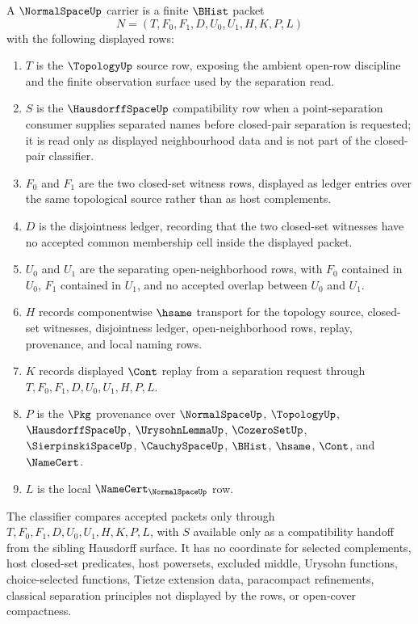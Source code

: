 \begin{definition}
\label{def:normal-space-carrier}
A $\NormalSpaceUp$ carrier is a finite $\BHist$ packet
$$
N=(T,F_0,F_1,D,U_0,U_1,H,K,P,L)
$$
with the following displayed rows:
\begin{enumerate}
\item $T$ is the $\TopologyUp$ source row, exposing the ambient open-row discipline and the finite observation surface used by the separation read.
\item $S$ is the $\HausdorffSpaceUp$ compatibility row when a point-separation consumer supplies separated names before closed-pair separation is requested; it is read only as displayed neighbourhood data and is not part of the closed-pair classifier.
\item $F_0$ and $F_1$ are the two closed-set witness rows, displayed as ledger entries over the same topological source rather than as host complements.
\item $D$ is the disjointness ledger, recording that the two closed-set witnesses have no accepted common membership cell inside the displayed packet.
\item $U_0$ and $U_1$ are the separating open-neighborhood rows, with $F_0$ contained in $U_0$, $F_1$ contained in $U_1$, and no accepted overlap between $U_0$ and $U_1$.
\item $H$ records componentwise $\hsame$ transport for the topology source, closed-set witnesses, disjointness ledger, open-neighborhood rows, replay, provenance, and local naming rows.
\item $K$ records displayed $\Cont$ replay from a separation request through $T,F_0,F_1,D,U_0,U_1,H,P,L$.
\item $P$ is the $\Pkg$ provenance over $\NormalSpaceUp$, $\TopologyUp$, $\HausdorffSpaceUp$, $\UrysohnLemmaUp$, $\CozeroSetUp$, $\SierpinskiSpaceUp$, $\CauchySpaceUp$, $\BHist$, $\hsame$, $\Cont$, and $\NameCert$.
\item $L$ is the local $\NameCert_{\NormalSpaceUp}$ row.
\end{enumerate}
The classifier compares accepted packets only through $T,F_0,F_1,D,U_0,U_1,H,K,P,L$, with $S$ available only as a compatibility handoff from the sibling Hausdorff surface. It has no coordinate for selected complements, host closed-set predicates, host powersets, excluded middle, Urysohn functions, choice-selected functions, Tietze extension data, paracompact refinements, classical separation principles not displayed by the rows, or open-cover compactness.
\end{definition}

